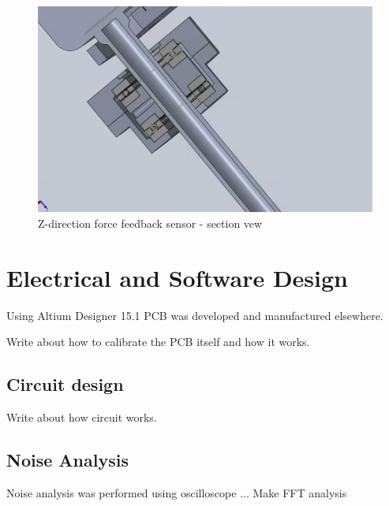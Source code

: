 \begin{figure}
	\begin{center}
		\includegraphics[width=120mm]{fig/methods/z_dir_sec.png}
	\end{center}
	\vspace{-4mm}
	\caption[Z-direction force feedback sensor - section vew]
	{Z-direction force feedback sensor - section vew}
	\label{fig:Z-direction_sec}
	\vspace{-2mm}
\end{figure}


\section{Electrical and Software Design}
\label{sec:elecDes}

Using Altium Designer 15.1 PCB was developed and manufactured elsewhere. 

Write about how to calibrate the PCB itself and how it works.

	\subsection{Circuit design}
	\label{sec:cirDes}
	Write about how circuit works.

	\subsection{Noise Analysis}
	\label{sec:NoiseExp}
	Noise analysis was performed using oscilloscope ... Make FFT analysis

